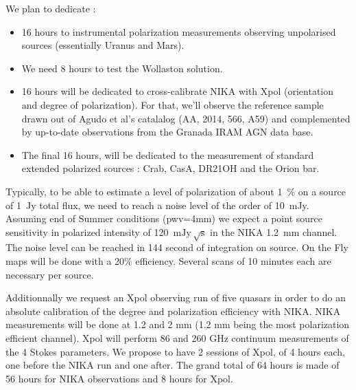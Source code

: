 \documentclass[12pt,a4]{article}
\begin{document}
We plan to dedicate :
\begin{itemize}
\item 16 hours to instrumental polarization measurements
observing unpolarised sources (essentially Uranus and Mars). 
\item We need 8 hours
to test the Wollaston solution. 
\item 16 hours will be dedicated to cross-calibrate
NIKA with Xpol (orientation and degree of polarization). For that, we'll
observe the reference sample drawn out of Agudo et al's catalalog (AA, 2014,
566, A59) and complemented by up-to-date observations from the Granada IRAM
AGN data base. 
\item The final 16 hours, will be dedicated to the measurement of
standard extended polarized sources : Crab, CasA, DR21OH and the Orion
bar. 
\end{itemize}
Typically, to be able to estimate a level of polarization of about 1~\%
on a source of 1~Jy total flux, we need to reach a noise level of the order of
10~mJy.  Assuming end of Summer conditions (pwv=4mm) we expect a point source
sensitivity in polarized intensity of 120~$\mathrm{mJy\,\sqrt{s}}$ in the NIKA
1.2~mm channel.  The noise level can be reached in 144 second of integration
on source. On the Fly maps will be done with a 20\% efficiency. Several scans
of 10 minutes each are necessary per source.

Additionnally we request an Xpol observing run of five quasars in order to do
an absolute calibration of the degree and polarization efficiency with NIKA.
NIKA measurements will be done at 1.2 and 2 mm (1.2 mm being the most
polarization efficient channel). Xpol will perform 86 and 260 GHz continuum
measurements of the 4 Stokes parameters. We propose to have 2 sessions of
Xpol, of 4 hours each, one before the NIKA run and one after. The grand total
of 64 hours is made of 56 hours for NIKA observations and 8 hours for Xpol.
\end{document}
